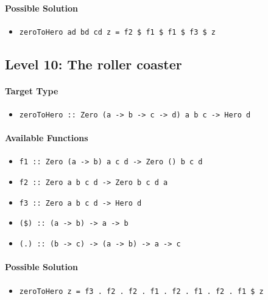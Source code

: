 \documentclass[preprint,12pt]{elsarticle}
\begin{document}
\paragraph{Possible Solution} 
\begin{itemize}
    \item \texttt{zeroToHero ad bd cd z = f2 \$ f1 \$ f1 \$ f3 \$ z}
\end{itemize}


\subsection{Level 10: The roller coaster}
\paragraph{Target Type } 
\begin{itemize}
    \item \texttt{zeroToHero :: Zero (a -> b -> c -> d) a b c  -> Hero d}
\end{itemize}

\paragraph{Available Functions} 
\begin{itemize}
    \item \texttt{f1 :: Zero (a -> b) a c d -> Zero () b c d}
    \item \texttt{f2 :: Zero a b c d -> Zero b c d a}
    \item \texttt{f3 :: Zero a b c d -> Hero d}
    \item \texttt{(\$) :: (a -> b) -> a -> b}
    \item \texttt{(.) :: (b -> c) -> (a -> b) -> a -> c}
\end{itemize}

\paragraph{Possible Solution} 
\begin{itemize}
    \item \texttt{zeroToHero z = f3 . f2 . f2 . f1 . f2 . f1 . f2 . f1 \$ z}
\end{itemize}
\end{document}
